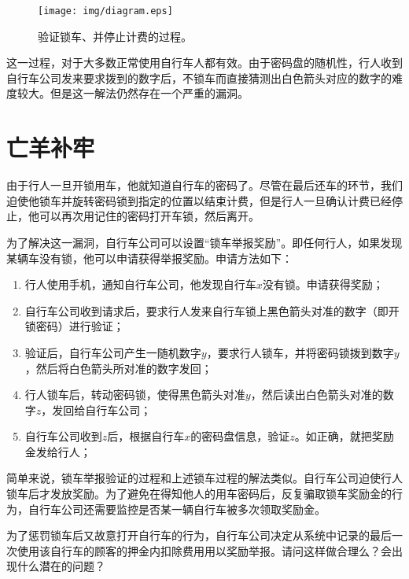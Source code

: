 \documentclass[UTF8]{article}
\begin{document}
\begin{figure}[htbp]
  \centering
  \texttt{[image: img/diagram.eps]}
  \caption{验证锁车、并停止计费的过程。}
  \label{fig:random-lock}
\end{figure}

这一过程，对于大多数正常使用自行车人都有效。由于密码盘的随机性，行人收到自行车公司发来要求拨到的数字后，不锁车而直接猜测出白色箭头对应的数字的难度较大。但是这一解法仍然存在一个严重的漏洞。

\section{亡羊补牢}
由于行人一旦开锁用车，他就知道自行车的密码了。尽管在最后还车的环节，我们迫使他锁车并旋转密码锁到指定的位置以结束计费，但是行人一旦确认计费已经停止，他可以再次用记住的密码打开车锁，然后离开。

为了解决这一漏洞，自行车公司可以设置“锁车举报奖励”。即任何行人，如果发现某辆车没有锁，他可以申请获得举报奖励。申请方法如下：

\begin{enumerate}
\item 行人使用手机，通知自行车公司，他发现自行车$x$没有锁。申请获得奖励；
\item 自行车公司收到请求后，要求行人发来自行车锁上黑色箭头对准的数字（即开锁密码）进行验证；
\item 验证后，自行车公司产生一随机数字$y$，要求行人锁车，并将密码锁拨到数字$y$，然后将白色箭头所对准的数字发回；
\item 行人锁车后，转动密码锁，使得黑色箭头对准$y$，然后读出白色箭头对准的数字$z$，发回给自行车公司；
\item 自行车公司收到$z$后，根据自行车$x$的密码盘信息，验证$z$。如正确，就把奖励金发给行人；
\end{enumerate}

简单来说，锁车举报验证的过程和上述锁车过程的解法类似。自行车公司迫使行人锁车后才发放奖励。为了避免在得知他人的用车密码后，反复骗取锁车奖励金的行为，自行车公司还需要监控是否某一辆自行车被多次领取奖励金。

\begin{Exercise}
为了惩罚锁车后又故意打开自行车的行为，自行车公司决定从系统中记录的最后一次使用该自行车的顾客的押金内扣除费用用以奖励举报。请问这样做合理么？会出现什么潜在的问题？
\end{Exercise}

\ifx\wholebook\relax \else
\end{document}
